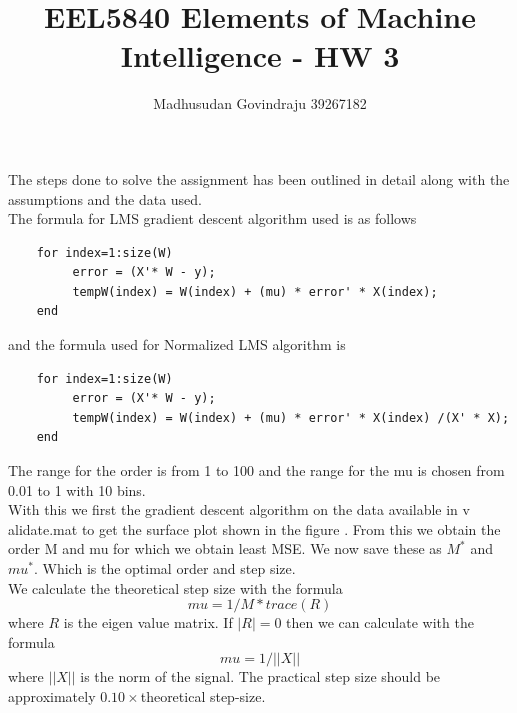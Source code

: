 \documentclass[10pt, letterpaper]{article}
\author{Madhusudan Govindraju 39267182 }
\date{}
\begin{document}
\title{EEL5840  Elements of Machine Intelligence - HW 3}
\maketitle

The steps done to solve the assignment has been outlined in detail along with the assumptions and the data used.\\

The formula for LMS gradient descent algorithm used is as follows 

\begin{verbatim}
	for index=1:size(W)
         error = (X'* W - y);
         tempW(index) = W(index) + (mu) * error' * X(index);
	end
\end{verbatim}

and the formula used for Normalized LMS algorithm is 
\begin{verbatim}
	for index=1:size(W)
         error = (X'* W - y);
         tempW(index) = W(index) + (mu) * error' * X(index) /(X' * X);
	end
\end{verbatim}

The range for the order is from 1 to 100 and the range for the mu is chosen from 0.01 to 1 with 10 bins. \\

With this we first the gradient descent algorithm on the data available in v alidate.mat to get the surface plot shown in the figure . From this we obtain the order M and mu for which we obtain least MSE. We now save these as $M^{*}$ and $mu^{*}$. Which is the optimal order and step size. \\

We calculate the theoretical step size with the formula $$ mu = 1 / M*trace(R) $$ where $R$ is the eigen value matrix. If $|R| = 0$ then we can calculate with the formula $$ mu = 1/||X||$$ where $||X||$ is the norm of the signal. The practical step size should be approximately $0.10\times$theoretical step-size. 
\end{document}
